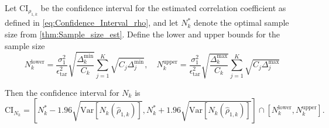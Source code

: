 %
\begin{theorem}
\label{thm:Sample_size_est_conf_interval} 
Let $\text{CI}_{\rho_{1,k}}$ be the confidence interval for the estimated correlation coefficient as defined in \eqref{eq:Confidence_Interval_rho}, and let $N_k^*$ denote the optimal sample size from \eqref{thm:Sample_size_est}. Define the lower and upper bounds for the sample size
%
\begin{equation}\label{eq:upper_lower_N_k}
    N_k^{\text{lower}} = \frac{\sigma_1^2}{\epsilon_{\text{tar}}^2}\sqrt{\frac{\Delta_k^{\min}}{C_k}}\sum_{j=1}^K\sqrt{C_j\Delta_j^{\min}},\quad N_k^{\text{upper}} = \frac{\sigma_1^2}{\epsilon_{\text{tar}}^2}\sqrt{\frac{\Delta_k^{\max}}{C_k}}\sum_{j=1}^K\sqrt{C_j\Delta_j^{\max}}
\end{equation}


%
Then the confidence interval for $N_k$ is
%
\[
\text{CI}_{N_k} = \left[N_k^*-1.96\sqrt{\text{Var}\left[N_k\left(\widehat\rho_{1,k}\right)\right]}, N_k^*+1.96\sqrt{\text{Var}\left[N_k\left(\widehat\rho_{1,k}\right)\right]}\right]\cap \left[N_k^{\text{lower}}, N_k^{\text{upper}}\right].
\]
%
\end{theorem}

